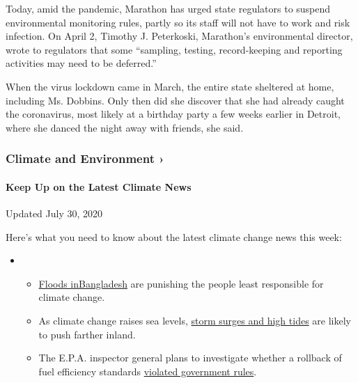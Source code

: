 Today, amid the pandemic, Marathon has urged state regulators to suspend
environmental monitoring rules, partly so its staff will not have to
work and risk infection. On April 2, Timothy J. Peterkoski, Marathon's
environmental director, wrote to regulators that some ``sampling,
testing, record-keeping and reporting activities may need to be
deferred.''

When the virus lockdown came in March, the entire state sheltered at
home, including Ms. Dobbins. Only then did she discover that she had
already caught the coronavirus, most likely at a birthday party a few
weeks earlier in Detroit, where she danced the night away with friends,
she said.

\href{https://www.nytimes3xbfgragh.onion/section/climate?action=click\&pgtype=Article\&state=default\&region=MAIN_CONTENT_1\&context=storylines_keepup}{}

\hypertarget{climate-and-environment-}{%
\subsubsection{Climate and Environment
›}\label{climate-and-environment-}}

\hypertarget{keep-up-on-the-latest-climate-news}{%
\paragraph{Keep Up on the Latest Climate
News}\label{keep-up-on-the-latest-climate-news}}

Updated July 30, 2020

Here's what you need to know about the latest climate change news this
week:

\begin{itemize}
\item
  \begin{itemize}
  \tightlist
  \item
    \href{https://www.nytimes3xbfgragh.onion/2020/07/30/climate/bangladesh-floods.html?action=click\&pgtype=Article\&state=default\&region=MAIN_CONTENT_1\&context=storylines_keepup}{Floods
    in}\href{https://www.nytimes3xbfgragh.onion/2020/07/30/climate/bangladesh-floods.html?action=click\&pgtype=Article\&state=default\&region=MAIN_CONTENT_1\&context=storylines_keepup}{Bangladesh}
    are punishing the people least responsible for climate change.
  \item
    As climate change raises sea levels,
    \href{https://www.nytimes3xbfgragh.onion/2020/07/30/climate/sea-level-inland-floods.html?action=click\&pgtype=Article\&state=default\&region=MAIN_CONTENT_1\&context=storylines_keepup}{storm
    surges and high tides} are likely to push farther inland.
  \item
    The E.P.A. inspector general plans to investigate whether a rollback
    of fuel efficiency standards
    \href{https://www.nytimes3xbfgragh.onion/2020/07/27/climate/trump-fuel-efficiency-rule.html?action=click\&pgtype=Article\&state=default\&region=MAIN_CONTENT_1\&context=storylines_keepup}{violated
    government rules}.
  \end{itemize}
\end{itemize}

